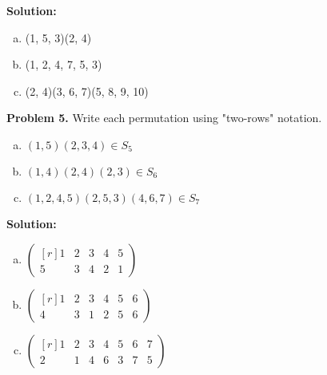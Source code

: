 \documentclass[12pt, letterpaper]{article}
\newenvironment{problem}
    [1]
    {\noindent \textbf{Problem #1.}}
    {\vspace{3mm}}
\newenvironment{solution}
    [0]
    {\noindent \textbf{Solution:}} 
    {\vspace{3mm}}
\begin{document}
\begin{solution}
    \begin{enumerate}[(a)]
        \item (1, 5, 3)(2, 4)
        \item (1, 2, 4, 7, 5, 3)
        \item (2, 4)(3, 6, 7)(5, 8, 9, 10)
    \end{enumerate}
\end{solution}

\begin{problem}{5}
    Write each permutation using "two-rows" notation.
    \begin{enumerate}[(a)]
        \item $(1, 5)(2, 3, 4) \in S_5$
        \item $(1, 4)(2, 4)(2, 3) \in S_6$
        \item $(1, 2, 4, 5)(2, 5, 3)(4, 6, 7) \in S_7$
    \end{enumerate}
\end{problem}

\begin{solution}
    \begin{enumerate}[(a)]
        \item $\begin{pmatrix*}[r] 1 & 2 & 3 & 4 & 5 \\ 5 & 3 & 4 & 2 & 1 \end{pmatrix*}$
        \item $\begin{pmatrix*}[r] 1 & 2 & 3 & 4 & 5 & 6 \\ 4 & 3 & 1 & 2 & 5 & 6 \end{pmatrix*}$
        \item $\begin{pmatrix*}[r] 1 & 2 & 3 & 4 & 5 & 6 & 7 \\ 2 & 1 & 4 & 6 & 3 & 7 & 5 \end{pmatrix*}$
    \end{enumerate}
\end{solution}
\end{document}
